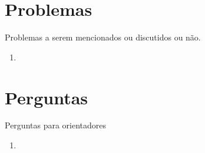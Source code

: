\documentclass[]{article}
\begin{document}
	\section{}
	
	
	
	
	
	
	\section{Problemas}
	
	Problemas a serem mencionados ou discutidos ou não.
	
	\begin{enumerate}
		
		\item 
	\end{enumerate}
	
	\section{Perguntas}
	
	Perguntas para orientadores
	
	\begin{enumerate}
		
		\item 
		
	\end{enumerate}
	
\end{document}
